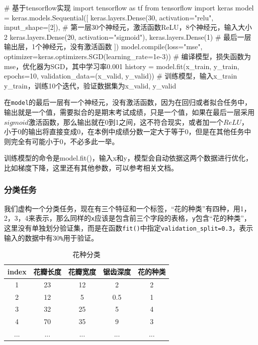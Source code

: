 \documentclass[a5paper, 11pt]{ctexbook}
\begin{document}
\begin{python}
    # 基于tensorflow实现
    import tensorflow as tf
    from tensorflow import keras
    model = keras.models.Sequential([
            keras.layers.Dense(30, activation="relu", input_shape=[2]),
            # 第一层30个神经元，激活函数ReLU，8个神经元，输入大小2
            keras.layers.Dense(20, activation="sigmoid"),
            keras.layers.Dense(1)
            # 最后一层输出层，1个神经元，没有激活函数
        ])
    model.compile(loss="mse", optimizer=keras.optimizers.SGD(learning_rate=1e-3))
    # 编译模型，损失函数为mse，优化器为SGD，其中学习率0.001
    history = model.fit(x_train, y_train, epochs=10,
    validation_data=(x_valid, y_valid))
    # 训练模型，输入x_train y_train，训练10个迭代，验证数据集为x_valid, y_valid
\end{python}\label{回归任务代码}

在\verb|model|的最后一层有一个神经元，没有激活函数，因为在回归或者拟合任务中，输出就是一个值，需要拟合的是期末考试成绩，只是一个值，如果在最后一层采用$sigmoid$激活函数，那么输出就在0到1之间，这不符合现实，或者加一个$ReLU$，小于0的输出将直接变成0，在本例中成绩分数一定大于等于0，但是在其他任务中则完全有可能小于0，不必多此一举。

训练模型的命令是model.fit()，输入x和y，模型会自动依据这两个数据进行优化，比如梯度下降，这里还有其他参数，可以参考相关文档。

\subsubsection{分类任务}\label{分类任务}

我们虚构一个分类任务，现在有三个特征和一个标签，“花的种类”有四种，用1，2，3，4来表示，那么同样的\verb|x|应该是包含前三个字段的表格，\verb|y|包含“花的种类”，这里没有单独划分验证集，而是在函数\verb|fit()|中指定\verb|validation_split=0.3|，表示输入的数据中有30\verb|%|用于验证。

\begin{table}[ht]
    \centering
    \caption{花种分类}
    \begin{tabular}{c c c c c}
        index & 花瓣长度 & 花瓣宽度 & 锯齿深度 & 花的种类 \\ \hline
        1     & 23   & 12   & 2    & 2    \\
        2     & 12   & 5    & 0.5  & 1    \\
        3     & 32   & 25   & 5    & 4    \\
        4     & 70   & 35   & 9    & 3    \\
        ...   & ...  & ...  & ...  & ...
    \end{tabular}
    \label{table2}
\end{table}
\end{document}
